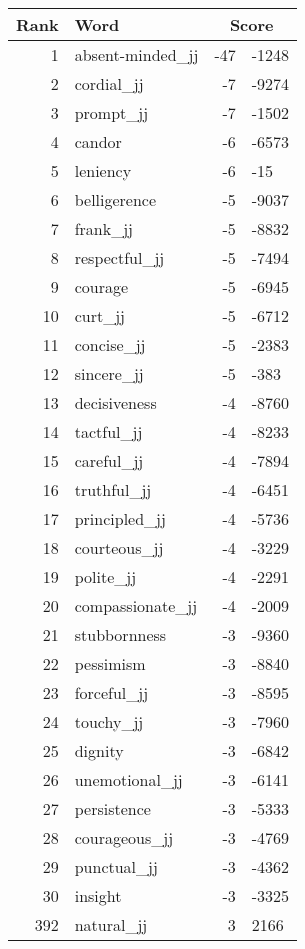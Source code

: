 \begin{longtable}[!htbp]{| rlr@{.}l |}
    \hline
    \textbf{Rank} & \textbf{Word} & \multicolumn{2}{c|}{\textbf{Score}} \\
    \hline
    \endhead
    1 & absent-minded\_jj & -47 & -1248 \\
    2 & cordial\_jj & -7 & -9274 \\
    3 & prompt\_jj & -7 & -1502 \\
    4 & candor & -6 & -6573 \\
    5 & leniency & -6 & -15 \\
    6 & belligerence & -5 & -9037 \\
    7 & frank\_jj & -5 & -8832 \\
    8 & respectful\_jj & -5 & -7494 \\
    9 & courage & -5 & -6945 \\
    10 & curt\_jj & -5 & -6712 \\
    11 & concise\_jj & -5 & -2383 \\
    12 & sincere\_jj & -5 & -383 \\
    13 & decisiveness & -4 & -8760 \\
    14 & tactful\_jj & -4 & -8233 \\
    15 & careful\_jj & -4 & -7894 \\
    16 & truthful\_jj & -4 & -6451 \\
    17 & principled\_jj & -4 & -5736 \\
    18 & courteous\_jj & -4 & -3229 \\
    19 & polite\_jj & -4 & -2291 \\
    20 & compassionate\_jj & -4 & -2009 \\
    21 & stubbornness & -3 & -9360 \\
    22 & pessimism & -3 & -8840 \\
    23 & forceful\_jj & -3 & -8595 \\
    24 & touchy\_jj & -3 & -7960 \\
    25 & dignity & -3 & -6842 \\
    26 & unemotional\_jj & -3 & -6141 \\
    27 & persistence & -3 & -5333 \\
    28 & courageous\_jj & -3 & -4769 \\
    29 & punctual\_jj & -3 & -4362 \\
    30 & insight & -3 & -3325 \\
    392 & natural\_jj & 3 & 2166 \\

\end{longtable}
